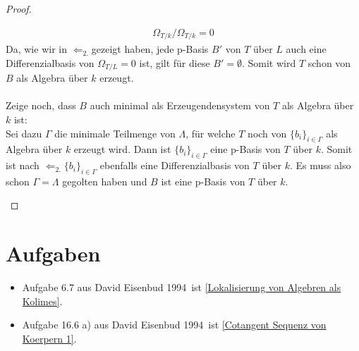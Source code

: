 \documentclass[10pt,a4paper]{report}
\newcommand{\comment}[1]{}
\newcommand{\ModulsOfDifferenzials}{David Eisenbud 1994}
\newcommand{\divR}[2]{\Omega_{#1/#2}}
\begin{document}
\begin{proof}
\begin{itemize}
\begin{gather*}
\divR{T}{k}/\divR{T}{k} = 0
\end{gather*}
Da, wie wir in \glqq$\Leftarrow_{2.}$\grqq gezeigt haben, jede p-Basis $B'$ von $T$ über $L$ auch eine Differenzialbasis von $\divR{T}{L} = 0$ ist, gilt für diese $B' = \emptyset$. Somit wird $T$ schon von $B$ als Algebra über $k$ erzeugt.\\
\ \\
Zeige noch, dass $B$ auch minimal als Erzeugendensystem von $T$ als Algebra über $k$ ist:\\
Sei dazu $\Gamma$ die minimale Teilmenge von $\Lambda$, für welche $T$ noch von $\lbrace b_i \rbrace_{i \in \Gamma}$ als Algebra über $k$ erzeugt wird. Dann ist $\lbrace b_i \rbrace_{i \in \Gamma}$ eine p-Basis von $T$ über $k$. Somit ist nach \glqq$\Leftarrow_{2.}$\grqq $\lbrace b_i \rbrace_{i \in \Gamma}$ ebenfalls eine Differenzialbasis von $T$ über $k$. Es muss also schon $\Gamma = \Lambda$ gegolten haben und $B$ ist eine p-Basis von $T$ über $k$. \comment{\label{*p-Basis ist minnimaler Erzeuger von T als Algebra}}
\end{itemize}
\end{proof}


\chapter{Aufgaben}
\begin{itemize}
\item Aufgabe 6.7 aus \ModulsOfDifferenzials \, ist \cref{Lokalisierung von Algebren als Kolimes}.
\item Aufgabe 16.6 a) aus \ModulsOfDifferenzials \, ist \cref{Cotangent Sequenz von Koerpern 1}.
\end{itemize}
\end{document}
